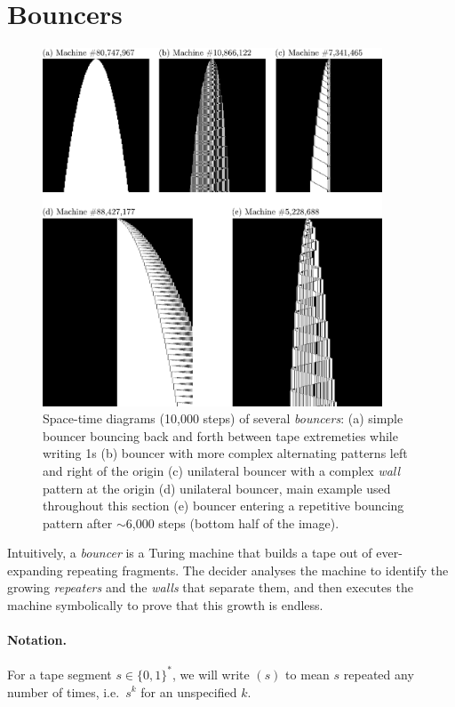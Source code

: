 
\section{Bouncers}\label{sec:bouncers}

\begin{figure}[h!]
    \centering
    \includegraphics*[width=0.9\textwidth]{figures/bouncers/bouncers.pdf}
    \caption{Space-time diagrams (10,000 steps) of several \textit{bouncers}: (a) simple bouncer bouncing back and forth between tape extremeties while writing 1s (b) bouncer with more complex alternating patterns left and right of the origin (c) unilateral bouncer with a complex \textit{wall} pattern at the origin (d) unilateral bouncer, main example used throughout this section (e) bouncer entering a repetitive bouncing pattern after $\sim$6,000 steps (bottom half of the image).}
\end{figure}


Intuitively, a \emph{bouncer} is a Turing machine that builds a tape out of
ever-expanding repeating fragments. The decider analyses the machine to
identify the growing \emph{repeaters} and the \emph{walls} that separate them,
and then executes the machine symbolically to prove that this growth is endless.

\paragraph{Notation.} For a tape segment $s \in \{0, 1\}^*$, we will
write $(s)$ to mean $s$ repeated any number of times, i.e.~$s^k$ for
an unspecified $k$.

